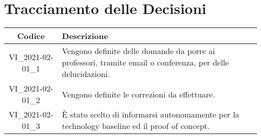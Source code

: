 \section*{Tracciamento delle Decisioni}

\begin{center}
	\begin{longtable}{|c|p{13cm}|}
	\hline
	\rowcolor{lighter-grayer}
	\textbf{Codice} & \textbf{Descrizione} \\
	\hline
	\endfirsthead

	\hline
	VI\_2021-02-01\_1 & Vengono definite delle domande da porre ai professori, tramite email o conferenza, per delle delucidazioni. \\
	\hline
	VI\_2021-02-01\_2 & Vengono definite le correzioni da effettuare. \\
	VI\_2021-02-01\_3 & È stato scelto di informarsi autonomamente per la technology baseline ed il proof of concept. \\
	\hline

	\end{longtable}
\end{center}